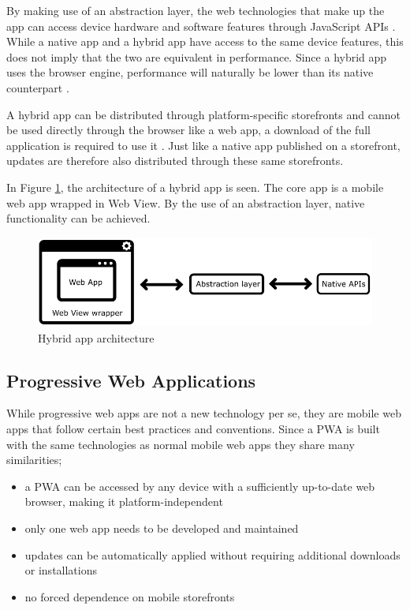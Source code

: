 \documentclass[a4paper,12pt]{article}
\begin{document}
By making use of an abstraction layer, the web technologies that make up the app can access device hardware and software features through JavaScript APIs \cite{crossplatform_2012}. While a native app and a hybrid app have access to the same device features, this does not imply that the two are equivalent in performance. Since a hybrid app uses the browser engine, performance will naturally be lower than its native counterpart \cite{crossplatform_taxonomy, crossplatform_2012}.

A hybrid app can be distributed through platform-specific storefronts and cannot be used directly through the browser like a web app, a download of the full application is required to use it \cite{crossplatform_2012, mobile_web_apps_2013}. Just like a native app published on a storefront, updates are therefore also distributed through these same storefronts.

In Figure \ref{fig:hybridapp}, the architecture of a hybrid app is seen. The core app is a mobile web app wrapped in Web View. By the use of an abstraction layer, native functionality can be achieved.

\begin{figure}[h]%
	\centering
	\includegraphics[height=3cm]{img/Other/struct_hybrid.png}
	\caption{Hybrid app architecture}%
	\label{fig:hybridapp}%
\end{figure}

\subsection{Progressive Web Applications}
\label{Theory_PWA}
While progressive web apps are not a new technology per se, they are mobile web apps that follow certain best practices and conventions. Since a PWA is built with the same technologies as normal mobile web apps they share many similarities;

\begin{itemize}
    \item a PWA can be accessed by any device with a sufficiently up-to-date web browser, making it platform-independent
    \item only one web app needs to be developed and maintained
    \item updates can be automatically applied without requiring additional downloads or installations
    \item no forced dependence on mobile storefronts
\end{itemize}
\end{document}
